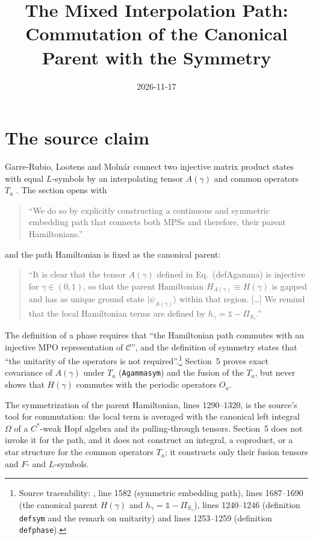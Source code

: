\documentclass{article}
\title{The Mixed Interpolation Path: Commutation of the Canonical Parent with the Symmetry}
\author{}
\date{2026-11-17}
\begin{document}
\maketitle
{}

\section{The source claim}
Garre-Rubio, Lootens and Moln\'ar connect two injective matrix product
states with equal $L$-symbols by an interpolating tensor $A(\gamma)$ and
common operators $T_a$ \cite[Section~5]{GarreRubio2023MPOSym}. The
section opens with
\begin{quote}
    ``We do so by explicitly constructing a continuous and symmetric
    embedding path that connects both MPSs and therefore, their parent
    Hamiltonians.''
\end{quote}
and the path Hamiltonian is fixed as the canonical parent:
\begin{quote}
    ``It is clear that the tensor $A(\gamma)$ defined in
    Eq.~(defAgamma) is injective for $\gamma \in (0,1)$, so that the
    parent Hamiltonian $H_{A(\gamma)} \equiv H(\gamma)$ is gapped and has
    as unique ground state $|\psi_{A(\gamma)} \rangle$ within that
    region. [\ldots] We remind that the local Hamiltonian terms are
    defined by $h_\gamma = \mathbb 1 - \Pi_{S_\gamma}$.''
\end{quote}
The definition of a phase requires that ``the Hamiltonian path commutes
with an injective MPO representation of $\mathcal C$'', and the
definition of symmetry states that ``the unitarity of the operators is
not required''.\footnote{Source traceability:
    , line 1582 (symmetric
    embedding path), lines 1687--1690 (the canonical parent $H(\gamma)$
    and $h_\gamma=\mathbb 1-\Pi_{S_\gamma}$), lines 1240--1246
    (definition \texttt{defsym} and the remark on unitarity) and
    lines 1253--1259 (definition \texttt{defphase}).}
Section~5 proves exact covariance of $A(\gamma)$ under $T_a$
(\texttt{Agammasym}) and the fusion of the $T_a$, but never shows that
$H(\gamma)$ commutes with the periodic operators $O_a$.

The symmetrization of the parent Hamiltonian, lines 1290--1320, is the
source's tool for commutation: the local term is averaged with the
canonical left integral $\Omega$ of a $C^*$-weak Hopf algebra and its
pulling-through tensors. Section~5 does not invoke it for the path, and
it does not construct an integral, a coproduct, or a star structure for
the common operators $T_a$; it constructs only their fusion tensors and
$F$- and $L$-symbols.
\end{document}
